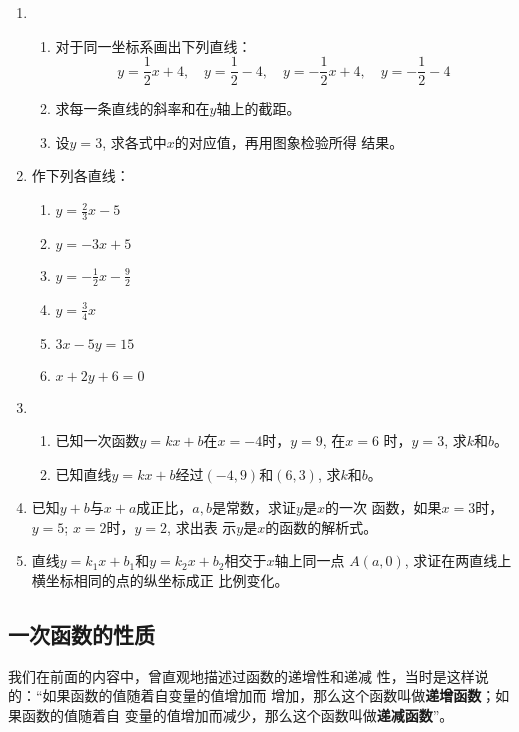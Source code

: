 \begin{ex}
\begin{enumerate}
    \item \begin{enumerate}
        \item 对于同一坐标系画出下列直线：
\[y=\frac{1}{2}x+4,\quad y=\frac{1}{2}-4,\quad y=-\frac{1}{2}x+4,\quad y=-\frac{1}{2}-4\]
\item 求每一条直线的斜率和在$y$轴上的截距。
\item 设$y=3$, 求各式中$x$的对应值，再用图象检验所得
结果。
    \end{enumerate}
    \item 作下列各直线：
\begin{multicols}{2}
    \begin{enumerate}
        \item $y=\frac{2}{3}x-5$
        \item $y=-3x+5$
        \item $y=-\frac{1}{2}x-\frac{9}{2}$
        \item $y=\frac{3}{4}x$
        \item $3x-5y=15$
        \item $x+2y+6=0$
    \end{enumerate}
\end{multicols}

\item \begin{enumerate}
    \item 已知一次函数$y=kx+b$在$x=-4$时，$y=9$, 在$x=6$
时，$y=3$, 求$k$和$b$。
\item 已知直线$y=kx+b$经过$(-4,9)$和$(6,3)$, 求$k$和$b$。
\end{enumerate}

\item 已知$y+b$与$x+a$成正比，$a,b$是常数，求证$y$是$x$的一次
函数，如果$x=3$时，$y=5$; $x=2$时，$y=2$, 求出表
示$y$是$x$的函数的解析式。
\item 直线$y=k_1x+b_1$和$y=k_2x+b_2$相交于$x$轴上同一点
$A(a,0)$, 求证在两直线上横坐标相同的点的纵坐标成正
比例变化。
\end{enumerate}
\end{ex}

\subsection{一次函数的性质}
我们在前面的内容中，曾直观地描述过函数的递增性和递减
性，当时是这样说的：“如果函数的值随着自变量的值增加而
增加，那么这个函数叫做\textbf{递增函数}；如果函数的值随着自
变量的值增加而减少，那么这个函数叫做\textbf{递减函数}”。

